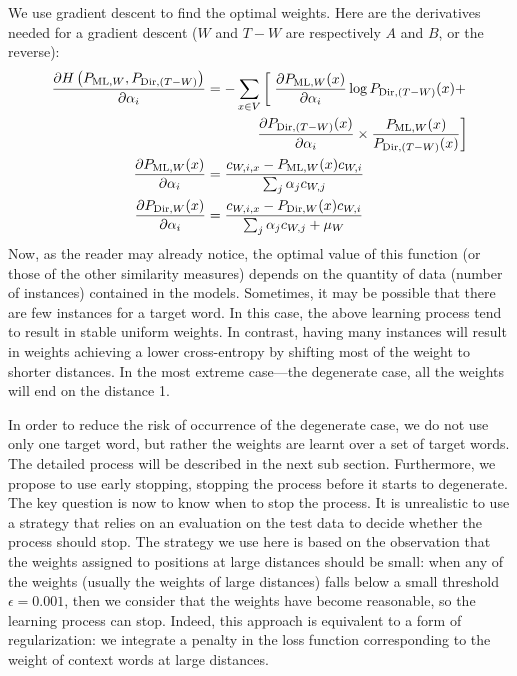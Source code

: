 \documentclass[english]{jnlp_1.4}
\begin{document}
We use gradient descent to fi{}nd the optimal weights. Here are the
derivatives needed for a gradient descent ($W$ and $T-W$ are respectively
$A$ and $B$, or the reverse):
\begin{align*}
\frac{\partial H\left(P_{\mathrm{ML},W},P_{\mathrm{Dir},(T-W)}\right)}{\partial\alpha_{i}} 
 & = -\sum_{x\in V}\left[\vphantom{\frac{\partial P_{\mathrm{ML},W}(x)}{\partial\alpha_{i}}}\right.\frac{\partial P_{\mathrm{ML},W}(x)}{\partial\alpha_{i}}\log P_{\mathrm{Dir},(T-W)}(x)+\\
 &  \hphantom{-\sum_{x\in V}\left[\vphantom{\frac{\partial P_{\mathrm{ML},W}(x)}{\partial\alpha_{i}}}\right.}\left.\frac{\partial P_{\mathrm{Dir},(T-W)}(x)}{\partial\alpha_{i}}\times\frac{P_{\mathrm{ML},W}(x)}{P_{\mathrm{Dir},(T-W)}(x)}\right]\\
\frac{\partial P_{\mathrm{ML},W}(x)}{\partial\alpha_{i}} 
 & =  \frac{c_{W,i,x}-P_{\mathrm{ML},W}(x)c_{W,i}}{\sum_{j}\alpha_{j}c_{W,j}}\\
\frac{\partial P_{\mathrm{Dir},W}(x)}{\partial\alpha_{i}} 
 & =  \frac{c_{W,i,x}-P_{\mathrm{Dir},W}(x)c_{W,i}}{\sum_{j}\alpha_{j}c_{W,j}+\mu_{W}}
\end{align*}
Now, as the reader may already notice, the optimal value of this function
(or those of the other similarity measures) depends on the quantity
of data (number of instances) contained in the models. Sometimes,
it may be possible that there are few instances for a target word.
In this case, the above learning process tend to result in stable
uniform weights. In contrast, having many instances will result in
weights achieving a lower cross-entropy by shifting most of the weight
to shorter distances. In the most extreme case---the degenerate
case, all the weights will end on the distance 1. 

In order to reduce the risk of occurrence of the degenerate case,
we do not use only one target word, but rather the weights are learnt
over a set of target words. The detailed process will be described
in the next sub section. Furthermore, we propose to use early stopping,
stopping the process before it starts to degenerate. The key question
is now to know when to stop the process. It is unrealistic to use
a strategy that relies on an evaluation on the test data to decide
whether the process should stop. The strategy we use here is based
on the observation that the weights assigned to positions at large
distances should be small: when any of the weights (usually the weights
of large distances) falls below a small threshold $\epsilon=0.001$,
then we consider that the weights have become reasonable, so the learning
process can stop. Indeed, this approach is equivalent to a form of
regularization: we integrate a penalty in the loss function corresponding
to the weight of context words at large distances.
\end{document}
